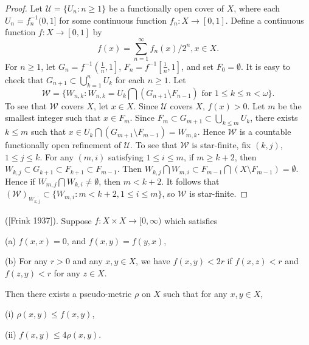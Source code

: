 \documentclass[main.tex]{subfiles}
\begin{document}
\begin{proof} 
Let $\mathscr{U} = \{U_n: n \ge 1\}$ be a functionally open cover of $X$, 
where each $U_n = f_n^{-1}(0, 1]$ for some continuous function $f_n: X \to [0, 1]$. 
Define a continuous function $f: X \to [0, 1]$ by
$$f(x) = \sum_{n=1}^{\infty} f_n(x) / 2^n, x\in X.$$
For $n \ge 1$, let $G_n = f^{-1}\left(\frac{1}{n}, 1\right]$, 
$F_n = f^{-1}\left[\frac{1}{n}, 1\right]$, and set $F_0 = \emptyset$.
It is easy to check that $G_{n+1} \subset \bigcup_{k=1}^{n} U_k$ for each $n \ge 1$.
Let
$$\mathscr{W} = \{W_{n,k}: W_{n,k} = U_k \bigcap (G_{n+1} \setminus F_{n-1})
 \text{ for } 
1\le k \le n<\omega\}.$$
To see that $\mathscr{W}$ covers $X$, let $x \in X$. 
Since $\mathscr{U}$ covers $X$, $f(x) > 0$. Let $m$ be the smallest integer such that 
$x \in F_m$. Since $F_m \subset G_{m+1} \subset \bigcup_{k \le m} U_k$, 
there exists $k \le m$ such that 
$x \in U_k \bigcap (G_{m+1} \setminus F_{m-1}) = W_{m,k}$.
Hence $\mathscr{W}$ is a countable functionally open refinement of $\mathscr{U}$.
To see that $\mathscr{W}$ is star-finite, fix $(k, j)$, $1 \le j \le k$. 
For any $(m, i)$ satisfying $1 \le i \le m$, if $m \ge k + 2$, 
then $W_{k,j} \subset G_{k+1} \subset F_{k+1} \subset F_{m-1}$. 
Then $W_{k,j} \bigcap W_{m,i} \subset F_{m-1}\bigcap(X\setminus F_{m-1})= \emptyset$.
Hence if $W_{m,j} \bigcap W_{k,i} \neq \emptyset$, then $m < k+2$.
It follows that $(\mathscr{W})_{W_{k,j}}\subset \{W_{m,i}: m < k+2, 1 \le i \le m\}$, 
so $\mathscr{W}$ is star-finite.
\end{proof}

{\theorem{\label{th:2.1.4}} \textup{([Frink 1937]\textsuperscript{\cite{Frink}})}. Suppose $f: X \times X \to [0, \infty)$ which satisfies

\textup{(a)} $f(x,x)=0$, and $f(x,y)=f(y,x)$,

\textup{(b)} For any $r > 0$ and any $x, y\in X$,  we have $f(x,y) < 2r$ if $f(x,z) < r$ 
and $f(z, y) < r$ for any $z\in X$.

Then there exists a pseudo-metric $\rho$ on $X$ such that for any $x, y \in X$,

\textup{(i)}  $\rho(x,y) \le f(x,y)$,

\textup{(ii)}  $f(x,y) \le 4\rho(x,y)$.
}
\end{document}
